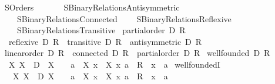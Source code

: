 %
\begin{isabellebody}%
%
%
\isadelimdocument
%
\endisadelimdocument
%
\isatagdocument
%
\isamarkuptrue%
%
\endisatagdocument
{\isafolddocument}%
%
\isadelimdocument
%
\endisadelimdocument
%
\isadelimtheory
%
\endisadelimtheory
%
\isatagtheory
{}\isamarkupfalse%
\ SOrders\isanewline
\ \ \isanewline
\ \ \ \ SBinary{\isacharunderscore}{\kern0pt}Relations{\isacharunderscore}{\kern0pt}Antisymmetric\isanewline
\ \ \ \ SBinary{\isacharunderscore}{\kern0pt}Relations{\isacharunderscore}{\kern0pt}Connected\isanewline
\ \ \ \ SBinary{\isacharunderscore}{\kern0pt}Relations{\isacharunderscore}{\kern0pt}Reflexive\isanewline
\ \ \ \ SBinary{\isacharunderscore}{\kern0pt}Relations{\isacharunderscore}{\kern0pt}Transitive\isanewline
{}%
\endisatagtheory
{\isafoldtheory}%
%
\isadelimtheory
\isanewline
%
\endisadelimtheory
\isanewline
{}\isamarkupfalse%
\ {\isachardoublequoteopen}partial{\isacharunderscore}{\kern0pt}order\ D\ R\ {\isasymequiv}\isanewline
\ \ reflexive\ D\ R\ {\isasymand}\ transitive\ D\ R\ {\isasymand}\ antisymmetric\ D\ R{\isachardoublequoteclose}\isanewline
\isanewline
{}\isamarkupfalse%
\ {\isachardoublequoteopen}linear{\isacharunderscore}{\kern0pt}order\ D\ R\ {\isasymequiv}\ connected\ D\ R\ {\isasymand}\ partial{\isacharunderscore}{\kern0pt}order\ D\ R{\isachardoublequoteclose}\isanewline
\isanewline
{}\isamarkupfalse%
\ {\isachardoublequoteopen}well{\isacharunderscore}{\kern0pt}founded\ D\ R\ {\isasymequiv}\isanewline
\ \ {\isasymforall}X{\isachardot}{\kern0pt}\ X\ {\isasymsubseteq}\ D\ {\isasymand}\ X\ {\isasymnoteq}\ {\isacharbraceleft}{\kern0pt}{\isacharbraceright}{\kern0pt}\ {\isasymlongrightarrow}\ {\isacharparenleft}{\kern0pt}{\isasymexists}a\ {\isasymin}\ X{\isachardot}{\kern0pt}\ {\isasymforall}x\ {\isasymin}\ X{\isachardot}{\kern0pt}\ {\isasymlangle}x{\isacharcomma}{\kern0pt}\ a{\isasymrangle}\ {\isasymin}\ R\ {\isasymlongrightarrow}\ x\ {\isacharequal}{\kern0pt}\ a{\isacharparenright}{\kern0pt}{\isachardoublequoteclose}\isanewline
\isanewline
{}\isamarkupfalse%
\ well{\isacharunderscore}{\kern0pt}foundedI{\isacharcolon}{\kern0pt}\isanewline
\ \ \ {\isachardoublequoteopen}{\isasymAnd}X{\isachardot}{\kern0pt}\ {\isasymlbrakk}X\ {\isasymsubseteq}\ D{\isacharsemicolon}{\kern0pt}\ X\ {\isasymnoteq}\ {\isacharbraceleft}{\kern0pt}{\isacharbraceright}{\kern0pt}{\isasymrbrakk}\ {\isasymLongrightarrow}\ {\isasymexists}a\ {\isasymin}\ X{\isachardot}{\kern0pt}\ {\isasymforall}x\ {\isasymin}\ X{\isachardot}{\kern0pt}\ {\isasymlangle}x{\isacharcomma}{\kern0pt}\ a{\isasymrangle}\ {\isasymin}\ R\ {\isasymlongrightarrow}\ x\ {\isacharequal}{\kern0pt}\ a{\isachardoublequoteclose}\isanewline

\end{isabellebody}
